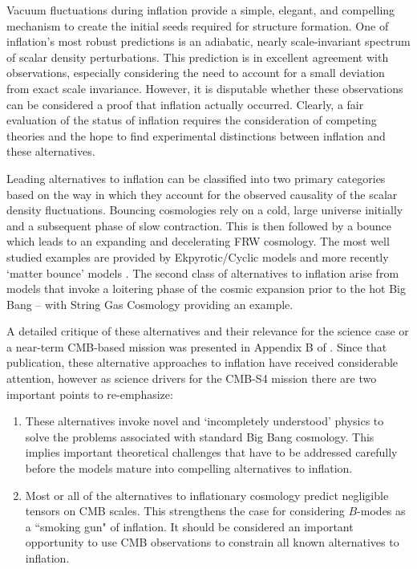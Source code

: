 Vacuum fluctuations during inflation provide a simple, elegant, and compelling mechanism to create the initial seeds required for structure formation. 
One of inflation's most robust predictions is an adiabatic, nearly
scale-invariant spectrum of scalar density perturbations.
This prediction is in excellent agreement with observations, especially considering
the need to account for a small deviation from
exact scale invariance.
However, it is disputable whether these observations can be considered a
proof that inflation actually occurred.
Clearly, a fair evaluation of the status of inflation requires the
consideration of competing theories and the hope to find experimental distinctions between inflation and these alternatives.

Leading alternatives to inflation can be classified into two primary categories based on the 
way in which they account for the observed causality of the scalar density fluctuations.
Bouncing cosmologies rely on a cold, large universe initially and a subsequent phase of
slow contraction. This is then followed by a bounce which leads
to an expanding and decelerating FRW cosmology.  The most well studied examples are provided by 
Ekpyrotic/Cyclic models \cite{Khoury:2001bz,Khoury:2001wf}
and more recently `matter bounce' models \cite{Brandenberger:2012zb,Cai:2014jla,deHaro:2015wda}.
The second class of alternatives to inflation arise from models that invoke a loitering phase of the cosmic expansion prior to the hot Big Bang -- with 
String Gas Cosmology \cite{Brandenberger:1988aj,Tseytlin:1991xk,Battefeld:2005av} providing an example. 

 A detailed critique of these alternatives and their relevance for the science case or a
near-term CMB-based mission was presented in Appendix B of \cite{Baumann:2008aq}.  
Since that publication, these alternative approaches to inflation have received considerable attention, 
however as science drivers for the CMB-S4 mission there are two important points to re-emphasize:
\begin{enumerate}
\item These alternatives invoke novel and `incompletely understood' physics to solve the problems associated with standard Big Bang cosmology.  This implies important theoretical challenges that have to be addressed carefully before the models mature into compelling alternatives to inflation.

\item Most or all of the alternatives to inflationary cosmology predict negligible tensors on CMB scales.
This strengthens the case for considering $B$-modes as a ``smoking gun" of inflation.  It should be considered an important
opportunity to use CMB observations to constrain all known alternatives to inflation.
\end{enumerate}

